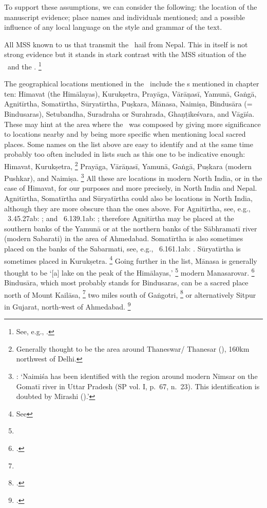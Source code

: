 To support these assumptions, we can consider the following:
the location of the manuscript evidence;
place names and individuals mentioned;
and a possible influence of any local language on
the style and grammar of the text.

All MSS known to us that transmit the \VSS\
hail from Nepal. This in itself is not strong evidence
but it stands in stark contrast with the MSS situation
of the \SDHS\ and the \SDHU.%
		\footnote{See, e.g., .}

The geographical locations 
mentioned in the \VSS\ include the
s mentioned in chapter ten:
Himavat (the Himālayas),
Kurukṣetra,
Prayāga,
Vārāṇasī,
Yamunā,
Gaṅgā,
Agnitīrtha, %
Somatīrtha, %
Sūryatīrtha, %
Puṣkara, %
Mānasa, %
Naimiṣa, %
Bindusāra (= Bindusaras), %
Setubandha, %
Suradraha or \linebreak Sura\-hrada, %
Ghaṇṭikeśvara,
and Vāgīśa.
These may hint at the area where the \VSS\ was
composed by giving more significance to 
locations nearby and by being more specific when
mentioning local sacred places.
Some names on the list above are 
easy to identify and at the same
time probably too often included in lists such as this one
to be indicative enough: 
Himavat, Kurukṣetra,%
	\footnote{Generally thought to be the area
		around Thaneswar\thinspace /\thinspace
		Thanesar (), 
		160km northwest of Delhi.}	
Prayāga, Vārāṇasī, Yamunā,
Gaṅgā, Puṣkara (modern Pushkar), and Naimiṣa.%
		\footnote{: 
		`Naimiśa has been identified with the region around 
		modern Nimsar on the Gomatī river in Uttar Pradesh
		(SP vol. I, p.~67, n.~23).
		This identification is doubted by Mirashi (\citeyear{MirashiNaimisa}).'}
All these are locations in modern North India, or in the case of Himavat,
for our purposes and more precisely, in North India and Nepal.
Agnitīrtha, Somatīrtha and Sūryatīrtha could also
be locations in North India, although they are
more obscure than the ones above.
For Agnitīrtha, see, e.g., \PadmaP\ 3.45.27ab:      
; and  
\PadmaP\  6.139.1ab:    
; 
therefore Agnitīrtha may be placed at the southern
banks of the Yamunā or at the northern banks of
the Sābhramatī river (modern Sabarati) in the area of
Ahmedabad.
Somatīrtha is also sometimes placed on the banks
of the Sabarmati, see, e.g., \PadmaP\  6.161.1ab:
.
Sūryatīrtha is sometimes placed in Kurukṣetra.%
		\footnote{See 
		}
Going further in the list, Mānasa is generally thought
to be `[a] lake on the peak of the Himālayas,'%
	\footnote{}
modern Mana\-sarovar.%
	\footnote{.} 
Bindusāra, which most probably stands for
Bindusaras, can be a sacred place north of Mount
Kailāsa,%
	\footnote{}
two miles south of Gaṅgotri,%
	\footnote{.}
or alternatively Sitpur in Gujarat, north-west of 
Ahmedabad.%
	\footnote{.}
	
